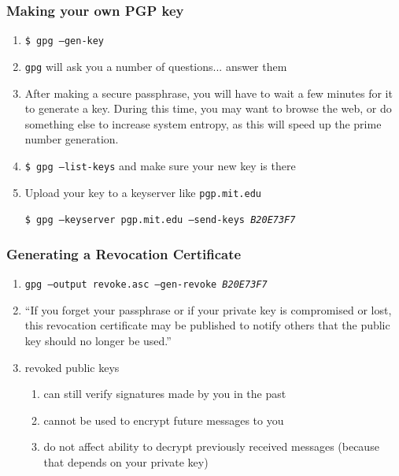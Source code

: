 \documentclass{beamer}
\begin{document}
\begin{frame}
    \frametitle{Making your own PGP key}
    \begin{enumerate}[<+->]
        \item \texttt{\$ gpg --gen-key}
        \item \texttt{gpg} will ask you a number of questions... answer them
        \item After making a secure passphrase, you will have to wait a few
            minutes for it to generate a key. During this time, you may want to
            browse the web, or do something else to increase system entropy, as
            this will speed up the prime number generation.
        \item \texttt{\$ gpg --list-keys} and make sure your new key is there
        \item Upload your key to a keyserver like \texttt{pgp.mit.edu}\par
            \texttt{\small \$ gpg --keyserver pgp.mit.edu --send-keys \emph{B20E73F7}}
    \end{enumerate}
\end{frame}

\begin{frame}
	\frametitle{Generating a Revocation Certificate}
	\begin{enumerate}[<+->]
		\item \texttt{gpg --output revoke.asc --gen-revoke \emph{B20E73F7}}
		\item ``If you forget your passphrase or if your private key is compromised or lost, this revocation certificate may be published to
			notify others that the public key should no longer be used.''
		\item revoked public keys
			\begin{enumerate}
				\item can still verify signatures made by you in the past
				\item cannot be used to encrypt future messages to you
				\item do not affect ability to decrypt previously received messages (because that depends on your private key)
			\end{enumerate}
	\end{enumerate}
\end{frame}
\end{document}
